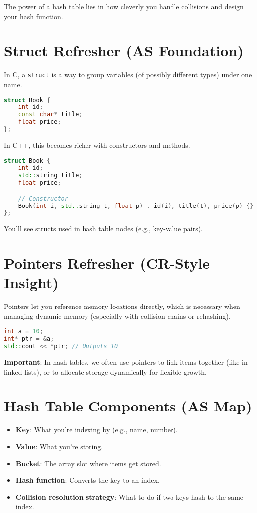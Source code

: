 \documentclass{article}
\begin{document}
The power of a hash table lies in how cleverly you handle collisions and design your hash function.

\section*{Struct Refresher (AS Foundation)}

In C, a \texttt{struct} is a way to group variables (of possibly different types) under one name.

\begin{lstlisting}[language=C++, caption={Basic struct definition in C-style}]
struct Book {
    int id;
    const char* title;
    float price;
};
\end{lstlisting}

In C++, this becomes richer with constructors and methods.

\begin{lstlisting}[language=C++, caption={C++ struct with constructor}]
struct Book {
    int id;
    std::string title;
    float price;

    // Constructor
    Book(int i, std::string t, float p) : id(i), title(t), price(p) {}
};
\end{lstlisting}

You’ll see structs used in hash table nodes (e.g., key-value pairs).

\section*{Pointers Refresher (CR-Style Insight)}

Pointers let you reference memory locations directly, which is necessary when managing dynamic memory (especially with collision chains or rehashing).

\begin{lstlisting}[language=C++, caption={Simple pointer usage}]
int a = 10;
int* ptr = &a;
std::cout << *ptr; // Outputs 10
\end{lstlisting}

\textbf{Important}: In hash tables, we often use pointers to link items together (like in linked lists), or to allocate storage dynamically for flexible growth.

\section*{Hash Table Components (AS Map)}

\begin{itemize}
    \item \textbf{Key}: What you're indexing by (e.g., name, number).
    \item \textbf{Value}: What you're storing.
    \item \textbf{Bucket}: The array slot where items get stored.
    \item \textbf{Hash function}: Converts the key to an index.
    \item \textbf{Collision resolution strategy}: What to do if two keys hash to the same index.
\end{itemize}
\end{document}
